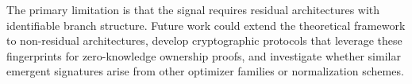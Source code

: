 \documentclass[wcp]{jmlr}
\begin{document}
The primary limitation is that the signal requires residual architectures with identifiable branch structure. Future work could extend the theoretical framework to non-residual architectures, develop cryptographic protocols that leverage these fingerprints for zero-knowledge ownership proofs, and investigate whether similar emergent signatures arise from other optimizer families or normalization schemes.



\end{document}
